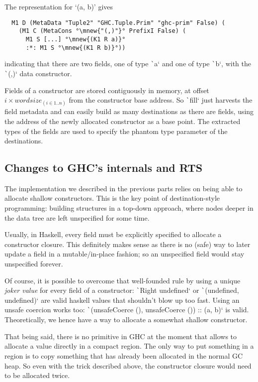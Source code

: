 \documentclass[english]{jflart}
\begin{document}
The representation for `(a, b)' gives

\begin{verbatim}
  M1 D (MetaData "Tuple2" "GHC.Tuple.Prim" "ghc-prim" False) (
    (M1 C (MetaCons °\mnew{"(,)"}° PrefixI False) (
      M1 S [...] °\mnew{(K1 R a)}°
      :*: M1 S °\mnew{(K1 R b)}°))
\end{verbatim}

indicating that there are two fields, one of type \texttt`a` and one of type \texttt`b`, with the \texttt`(,)` data constructor.

Fields of a constructor are stored contiguously in memory, at offset $i \times \textit{wordsize}_{(i \in 1..n)}$ from the constructor base address. So \texttt`fill` just harvests the field metadata and can easily build as many destinations as there are fields, using the address of the newly allocated constructor as a base point. The extracted types of the fields are used to specify the phantom type parameter of the destinations.

\subsection{Changes to GHC's internals and RTS}

The implementation we described in the previous parts relies on being able to allocate shallow constructors. This is the key point of destination-style programming: building structures in a top-down approach, where nodes deeper in the data tree are left unspecified for some time.

Usually, in Haskell, every field must be explicitly specified to allocate a constructor closure. This definitely makes sense as there is no (safe) way to later update a field in a mutable/in-place fashion; so an unspecified field would stay unspecified forever.

Of course, it is possible to overcome that well-founded rule by using a unique \emph{joker value} for every field of a constructor: \texttt`Right undefined` or \texttt`(undefined, undefined)` are valid haskell values that shouldn't blow up too fast. Using an unsafe coercion works too: \texttt`(unsafeCoerce (), unsafeCoerce ()) :: (a, b)` is valid. Theoretically, we hence have a way to allocate a somewhat shallow constructor.

That being said, there is no primitive in GHC at the moment that allows to allocate a value directly in a compact region. The only way to put something in a region is to copy something that has already been allocated in the normal GC heap. So even with the trick described above, the constructor closure would need to be allocated twice.
\end{document}
